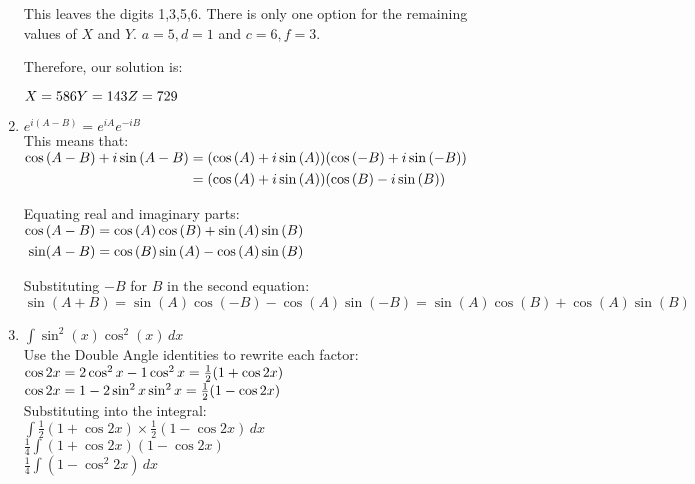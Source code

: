 \documentclass[../main.tex]{subfiles}
\begin{document}
\begin{enumerate}[itemsep=1cm]
    This leaves the digits 1,3,5,6. There is only one option for the remaining values of $X$ and $Y$. $a=5, d=1$ and $c=6, f=3$.

    Therefore, our solution is:

    $X=586\\
    Y=143\\
    Z=729$

    \item
    \(e^{i(A-B)}=e^{iA}e^{-iB}\)\\
    This means that:\\
    $
    \!
    \begin{aligned}[t]
    \cos{(A-B)+i\sin{(A-B)}}
    &=(\cos{(A)+i\sin{(A)}})(\cos{(-B)+i\sin{(-B)}})\\
    &=(\cos{(A)+i\sin{(A)}})(\cos{(B)-i\sin{(B)}})
    \end{aligned}\\
    $
    
    Equating real and imaginary parts:\\
    $
    \!
    \begin{aligned}[t]
    \cos{(A-B)}
    &=\cos{(A)}\cos{(B)}+\sin{(A)}\sin{(B)}\\
    \sin(A-B)
    &=\cos{(B)}\sin{(A)}-\cos{(A)}\sin{(B)}\\
    \end{aligned}\\
    $

    Substituting \(-B\) for \(B\) in the second equation:\\
    \(\sin{(A+B)}=\sin{(A)}\cos{(-B)}-\cos{(A)}\sin{(-B)}=\sin{(A)}\cos{(B)}+\cos{(A)}\sin{(B)}\)\\

    \item 
    \(\int \sin^2{(x)}\cos^2{(x)} \,dx\)\\
    Use the Double Angle identities to rewrite each factor:\\
    \(\cos{2x}=2\cos^2{x}-1\\
    \cos^2{x}=\frac{1}{2}(1+\cos{2x})\)\\
    \(\cos{2x}=1-2\sin^2{x}\\
    \sin^2{x}=\frac{1}{2}(1-\cos{2x})\)\\

    Substituting into the integral:\\
    \(\int \frac{1}{2}(1+\cos{2x}) \times \frac{1}{2}(1-\cos{2x}) \,dx\)\\
    \(\frac{1}{4}\int (1+\cos{2x})(1-\cos{2x}) \,\)\\
    \(\frac{1}{4}\int (1-\cos^2{2x}) \,dx\)\\


\end{enumerate}
\end{document}
